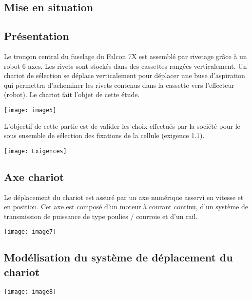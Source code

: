 \begin{multicols}{2}
\section*{Mise en situation}
\ifprof
\else

\subsection*{Présentation}
Le tronçon central du fuselage du Falcon 7X est assemblé par rivetage grâce à un robot 6 axes. Les rivets sont stockés dans des cassettes rangées verticalement. Un chariot de sélection se déplace verticalement pour déplacer une buse d'aspiration qui permettra d'acheminer les rivets contenus dans la cassette vers l'effecteur (robot). Le chariot fait l'objet de cette étude.

\begin{center}
\texttt{[image: image5]}
\end{center} 

 
L'objectif de cette partie est de valider les choix effectués par la société pour le sous ensemble de sélection des fixations de la cellule (exigence 1.1).

\vfill

\begin{center}
\texttt{[image: Exigences]}
\end{center} 




 
\subsection*{Axe chariot}
Le déplacement du chariot est assuré par un axe numérique asservi en vitesse et en position. Cet axe est composé d'un moteur à courant continu, d'un système de transmission de puissance de type poulies / courroie et d'un rail.
 
\begin{center}
\texttt{[image: image7]}
\end{center} 


\subsection*{Modélisation du système de déplacement du chariot}

\begin{center}
\texttt{[image: image8]}
\end{center} 



\end{multicols}
